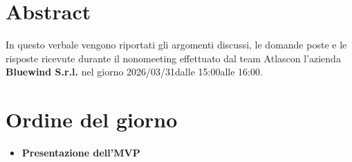 \documentclass[a4paper,12pt]{article}
\newcommand{\Gruppo}{Atlas}
\newcommand{\DataVerbale}{2026/03/31}
\newcommand{\NumeroVerbaleEsterno}{nono}
\newcommand{\OraInizio}{15:00}
\newcommand{\OraFine}{16:00}
\newcommand{\AbstractVerbale}{
    In questo verbale vengono riportati gli argomenti discussi, le domande poste e le risposte ricevute durante il \NumeroVerbaleEsterno \space meeting effettuato dal team \Gruppo \space con l'azienda \textbf{Bluewind S.r.l.} nel giorno \DataVerbale \space dalle \OraInizio \space alle \OraFine.
}
\begin{document}
\newpage

\tableofcontents

\newpage


\section{Abstract}{
    \begin{minipage}{0.9\textwidth}
        \small
        \AbstractVerbale
    \end{minipage}
}


\section{Ordine del giorno}{
    \begin{itemize}
        \item \textbf{Presentazione dell'MVP}
    \end{itemize}
}
\end{document}
